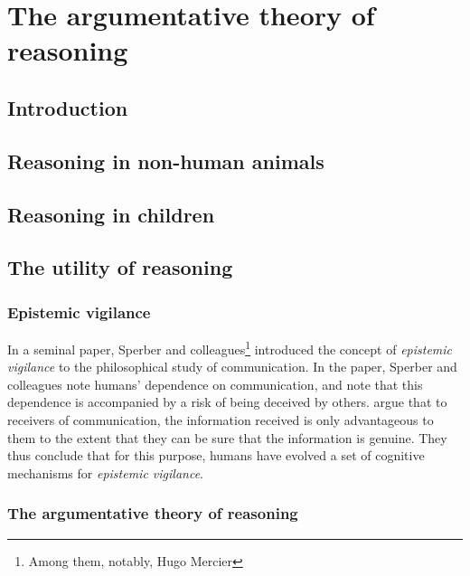 \chapter{The argumentative theory of reasoning}
\label{ch:reasoning}

\section*{Introduction}

\section{Reasoning in non-human animals}

\section{Reasoning in children}

\section{The utility of reasoning}

\subsection{Epistemic vigilance}

In a seminal \citeyear{Sperber10} paper, Sperber and colleagues\footnote{Among them, notably, Hugo Mercier} introduced the concept of \emph{epistemic vigilance} to the philosophical study of communication.
In the paper, Sperber and colleagues note humans' dependence on communication, and note that this dependence is accompanied by a risk of being deceived by others.
argue that to receivers of communication, the information received is only advantageous to them to the extent that they can be sure that the information is genuine.
They thus conclude that for this purpose, humans have evolved a set of cognitive mechanisms for \emph{epistemic vigilance}.

\subsection{The argumentative theory of reasoning}

